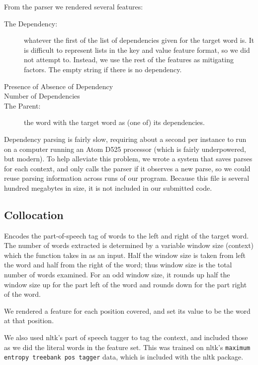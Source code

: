 \documentclass{article}
\begin{document}
From the parser we rendered several features:
\begin{description}

\item[The Dependency:] whatever the first of the list of dependencies given for the target word is.  It is difficult to represent lists in the key and value feature format, so we did not attempt to.  Instead, we use the rest of the features as mitigating factors.  The empty string if there is no dependency.

\item[Presence of Absence of Dependency]

\item[Number of Dependencies]

\item[The Parent:] the word with the target word as (one of) its dependencies.

\end{description}

Dependency parsing is fairly slow, requiring about a second per instance to run on a computer running an Atom D525 processor (which is fairly underpowered, but modern).  To help alleviate this problem, we wrote a system that saves parses for each context, and only calls the parser if it observes a new parse, so we could reuse parsing information across runs of our program.  Because this file is several hundred megabytes in size, it is not included in our submitted code.

\subsection{Collocation}

Encodes the part-of-speech tag of words to the left and right of the target word. The number of words extracted is determined by a variable window size (context) which the function takes in as an input. Half the window size is taken from left the word and half from the right of the word; thus window size is the total number of words examined. For an odd window size, it rounds up half the window size up for the part left of the word and rounds down for the part right of the word.

We rendered a feature for each position covered, and set its value to be the word at that position.

We also used nltk's part of speech tagger to tag the context, and included those as we did the literal words in the feature set.  This was trained on nltk's \verb+maximum entropy treebank pos tagger+ data, which is included with the nltk package.
\end{document}
